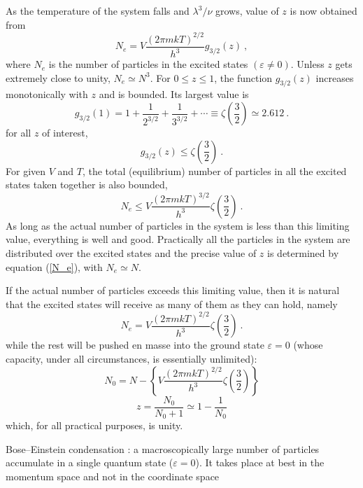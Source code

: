 \documentclass[12pt,a4paper]{article}
\begin{document}
As the temperature of the system falls and  $\lambda^3/\nu$ grows, value of $z$ is now obtained from
\begin{equation}
N_e = V \frac{(2\pi mkT)^{2/2}}{h^3} g_{3/2}(z) ~,
\label{N_e}
\end{equation}
where $N_e$ is the number of particles in the excited states $(\varepsilon \neq 0)$. Unless $z$ gets extremely close to unity, $N_e \simeq N^3$. For $0 \leqslant z \leqslant 1$, the function $g_{3/2}(z)$ increases monotonically with $z$ and is bounded. Its largest value is
\begin{equation}
g_{3/2}(1) = 1 +\frac{1}{2^{3/2}} +\frac{1}{3^{3/2}} +\cdots \equiv \zeta\left(\frac{3}{2}\right) \simeq 2.612 ~.
\end{equation}
for all $z$ of interest,
\begin{equation}
g_{3/2}(z) \leqslant \zeta\left(\frac{3}{2}\right) ~.
\end{equation}
For given $V$ and $T$, the total (equilibrium) number of particles in all the excited states taken together is also bounded, 
\begin{equation}
N_e \leqslant V\frac{(2\pi mkT)^{3/2}}{h^3} \zeta\left(\frac{3}{2}\right) ~.
\end{equation}
As long as the actual number of particles in the system is less than this limiting value, everything is well and good. Practically all the particles in the system are distributed over the excited states and the precise value of $z$ is determined by equation (\ref{N_e}), with $N_e \simeq N$.

If the actual number of particles exceeds this limiting value, then it is natural that the excited states will receive as many of them as they can hold, namely
\begin{equation}
N_e = V\frac{(2\pi mkT)^{2/2}}{h^3} \zeta\left(\frac{3}{2}\right) ~.
\end{equation}
while the rest will be pushed en masse into the ground state $\varepsilon = 0$ (whose capacity, under all circumstances, is essentially unlimited):
\begin{equation}
N_0 = N-\left\{V\frac{(2\pi mkT)^{2/2}}{h^3} \zeta\left(\frac{3}{2}\right) \right\}
\end{equation}
\begin{equation}
z = \frac{N_0}{N_0+1} \simeq 1-\frac{1}{N_0}
\end{equation}
which, for all practical purposes, is unity.

Bose–Einstein condensation : a macroscopically large number of particles accumulate in a single quantum state ($\varepsilon = 0$). It takes place at best in the momentum space and not in the coordinate space
\end{document}
